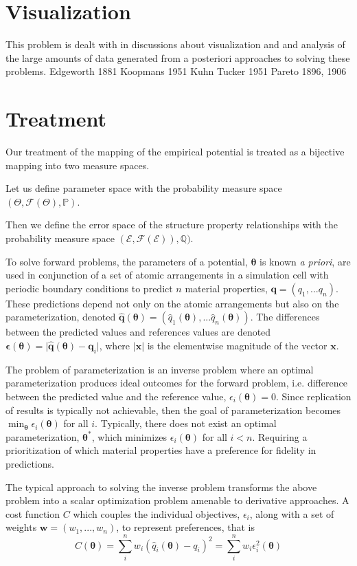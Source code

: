 \section{Visualization}
This problem is dealt with in discussions about visualization and and analysis of the large amounts of data generated from a posteriori approaches to solving these problems.
Edgeworth 1881
Koopmans 1951
Kuhn Tucker 1951
Pareto 1896, 1906
\section{Treatment}

Our treatment of the mapping of the empirical potential is treated as a bijective mapping into two measure spaces.

Let us define parameter space with the probability measure space $(\Theta,\mathcal{F}(\Theta),\mathbb{P})$.

Then we define the error space of the structure property relationships with the probability measure space $(\mathcal{E},\mathcal{F}(\mathcal{E})),\mathbb{Q})$.


To solve forward problems, the parameters of a potential, $\bm{\theta}$ is known \emph{a priori}, are used in conjunction of a set of atomic arrangements in a simulation cell with periodic boundary conditions to predict $n$ material properties, $\bm{q} = (q_1,...q_n)$.  These predictions depend not only on the atomic arrangements but also on the parameterization, denoted
$\bm{\hat{q}}(\bm{\theta}) =
    (\hat{q}_1(\bm{\theta}),...\hat{q}_n(\bm{\theta}))$.
The differences between the predicted values and references values are denoted
$\bm{\epsilon}(\bm{\theta}) =
    \lvert \bm{\hat{q}}(\bm{\theta})
         - \bm{q}_i
    \rvert$,
where $|\bm{x}|$ is the elementwise magnitude of the vector $\bm{x}$.

The problem of parameterization is an inverse problem where an optimal parameterization produces ideal outcomes for the forward problem, i.e. difference between the predicted value and the reference value,
$\epsilon_i(\bm{\theta}) = 0$.
Since replication of results is typically not achievable, then the goal of parameterization becomes
$\min_{\bm{\theta}} \epsilon_i(\bm{\theta})$
for all $i$.  Typically, there does not exist an optimal parameterization, $\bm{\theta}^*$, which minimizes $\epsilon_i(\bm{\theta})$ for all $i < n$.  Requiring a prioritization of which material properties have a preference for fidelity in predictions.

The typical approach to solving the inverse problem transforms the above problem into a scalar optimization problem amenable to derivative approaches.  A cost function $C$ which couples the individual objectives, $\epsilon_i$, along with a set of weights $\bm{w} = (w_1,...,w_n)$, to represent preferences, that is
\begin{equation}
    C(\bm{\theta}) = \sum_i^n w_i (\hat{q}_i(\bm{\theta}) - q_i)^2
                   = \sum_i^n w_i \epsilon_i^2(\bm{\theta})
\end{equation}

